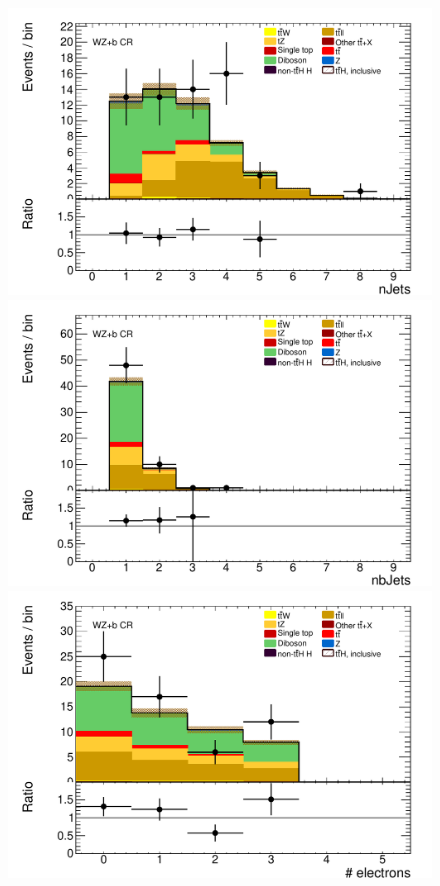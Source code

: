 \begin{figure}[!htbp]

  \begin{minipage}[h]{0.5\textwidth}
    \centering \includegraphics[width=\textwidth]{figs/WZ/standardCR_3l_WZ_MT_1b_nJets_OR_thesis}
  \end{minipage}\hfill
  \begin{minipage}[h]{0.5\textwidth}
    \centering \includegraphics[width=\textwidth]{figs/WZ/standardCR_3l_WZ_MT_1b_nJets_OR_MV1_70_thesis}
  \end{minipage}\hfill
  \begin{minipage}[h]{0.5\textwidth}
    \centering \includegraphics[width=\textwidth]{figs/WZ/standardCR_3l_WZ_MT_1b_nelec_thesis}

\end{minipage}
\end{figure}
